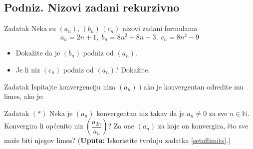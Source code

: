 \subsection*{Podniz. Nizovi zadani rekurzivno}
\begin{exercise}{Zadatak} Neka su \((a_n),\,(b_n)\, (c_n)\) nizovi zadani formulama 
\[a_n=2n+1,\;b_n=8n^2+8n+3, \; c_n=8n^2-9\]
\begin{itemize}
\item[a)] Dokažite da je \((b_n)\) podniz od \((a_n)\).
\item[b)] Je li niz \((c_n)\) podniz od \((a_n)\)? Dokažite.
\end{itemize}
\end{exercise}
\begin{exercise}{Zadatak}
Ispitajte konvergenciju niza \((a_n)\) i ako je konvergentan odredite mu limes, ako je:
\end{exercise}
\begin{exercise}{Zadatak} $(*)$
Neka je \((a_n)\) konvergentan niz takav da je \(a_n\neq 0\) za sve \(n\in \mathbb{N}\). Konvergira li općenito niz \(\left(\dfrac{a_{2n}}{a_n}\right)\)? Za one $(a_n)$ za koje on konvergira, što sve može biti njegov limes? (\textbf{Uputa:} Iskoristite tvrdnju zadatka \ref{setoflimits}.)
\end{exercise}
